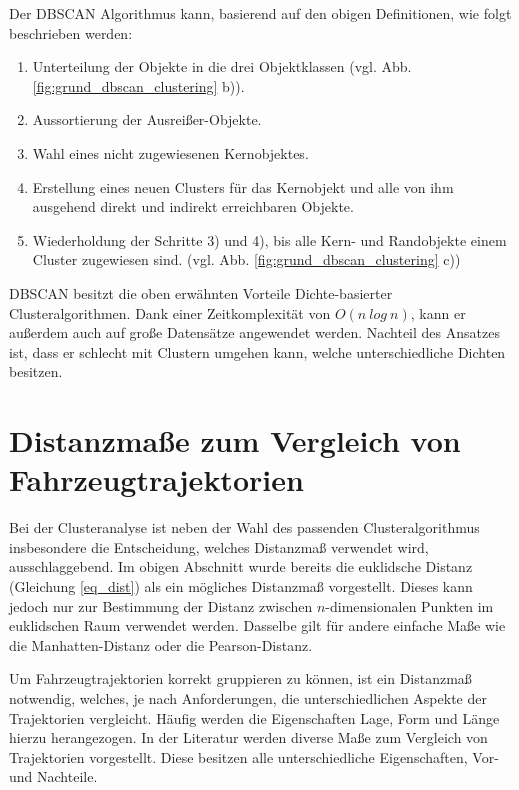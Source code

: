 Der DBSCAN Algorithmus kann, basierend auf den obigen Definitionen, wie folgt beschrieben werden:

\begin{enumerate}
    \item Unterteilung der Objekte in die drei Objektklassen (vgl. Abb. \ref{fig:grund_dbscan_clustering} b)).
    \item Aussortierung der Ausreißer-Objekte.
    \item Wahl eines nicht zugewiesenen Kernobjektes.
    \item Erstellung eines neuen Clusters für das Kernobjekt und alle von ihm ausgehend direkt und indirekt erreichbaren Objekte.
    \item Wiederholdung der Schritte 3) und 4), bis alle Kern- und Randobjekte einem Cluster zugewiesen sind. (vgl. Abb. \ref{fig:grund_dbscan_clustering} c))
\end{enumerate}

DBSCAN besitzt die oben erwähnten Vorteile Dichte-basierter Clusteralgorithmen. Dank einer Zeitkomplexität
von $O(n\ log\ n)$, kann er außerdem auch auf große Datensätze angewendet werden.
Nachteil des Ansatzes ist, dass er schlecht mit Clustern umgehen kann, welche unterschiedliche Dichten besitzen.

\section{Distanzmaße zum Vergleich von Fahrzeugtrajektorien}
\label{sec:distance_measures}

Bei der Clusteranalyse ist neben der Wahl des passenden Clusteralgorithmus insbesondere
die Entscheidung, welches Distanzmaß verwendet wird, ausschlaggebend.
Im obigen Abschnitt wurde bereits die euklidsche Distanz (Gleichung \ref{eq_dist}) als ein mögliches Distanzmaß
vorgestellt. Dieses kann jedoch nur zur Bestimmung der Distanz zwischen $n$-dimensionalen Punkten im euklidschen Raum verwendet
werden. Dasselbe gilt für andere einfache Maße wie die Manhatten-Distanz oder die Pearson-Distanz.

Um Fahrzeugtrajektorien korrekt gruppieren zu können, ist ein Distanzmaß notwendig, welches, je nach Anforderungen,
die unterschiedlichen Aspekte der Trajektorien vergleicht. Häufig werden die Eigenschaften Lage, Form und Länge
hierzu herangezogen. In der Literatur werden diverse Maße zum Vergleich von Trajektorien vorgestellt. Diese besitzen
alle unterschiedliche Eigenschaften, Vor- und Nachteile.

